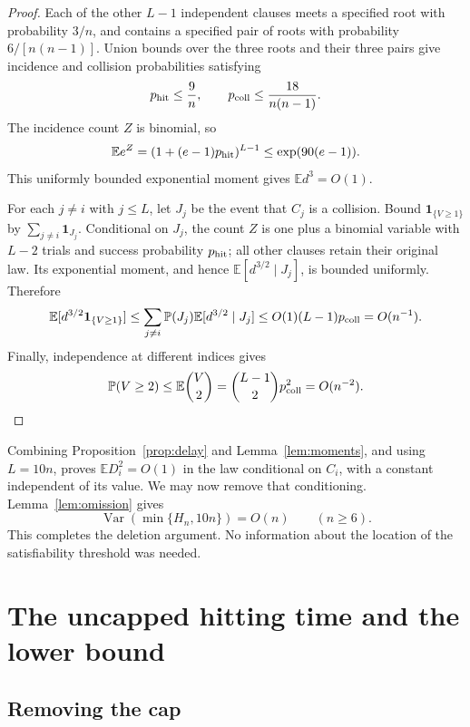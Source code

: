 \documentclass[11pt]{article}
\theoremstyle{remark}
\newcommand{\Prb}{\mathbb P}
\newcommand{\E}{\mathbb E}
\newcommand{\Var}{\operatorname{Var}}
\newcommand{\ind}{\mathbf 1}
\numberwithin{equation}{section}
\begin{document}
\begin{proof}
Each of the other $L-1$ independent clauses meets a specified root
with probability $3/n$, and contains a specified pair of roots with
probability $6/[n(n-1)]$. Union bounds over the three roots and their
three pairs give incidence and collision probabilities satisfying
\[
 p_{\rm hit}\le\frac9n,\qquad
 p_{\rm coll}\le\frac{18}{n(n-1)}.
\]
The incidence count $Z$ is binomial, so
\[
 \E e^Z=(1+(e-1)p_{\rm hit})^{L-1}
      \le\exp(90(e-1)).
\]
This uniformly bounded exponential moment gives $\E d^3=O(1)$.

For each $j\ne i$ with $j\le L$, let $J_j$ be the event that $C_j$
is a collision. Bound $\ind_{\{V\ge1\}}$ by
$\sum_{j\ne i}\ind_{J_j}$. Conditional on $J_j$, the count $Z$ is
one plus a binomial variable with $L-2$ trials and success probability
$p_{\rm hit}$; all other clauses retain their original law.
Its exponential moment, and hence $\E[d^{3/2}\mid J_j]$, is bounded
uniformly. Therefore
\[
 \E[d^{3/2}\ind_{\{V\ge1\}}]
 \le\sum_{j\ne i}\Prb(J_j)\E[d^{3/2}\mid J_j]
 \le O(1)(L-1)p_{\rm coll}=O(n^{-1}).
\]
Finally, independence at different indices gives
\[
 \Prb(V\ge2)\le\E\binom V2
 =\binom{L-1}{2}p_{\rm coll}^2=O(n^{-2}).
\]
\end{proof}

Combining Proposition~\ref{prop:delay} and Lemma~\ref{lem:moments},
and using $L=10n$, proves $\E D_i^2=O(1)$ in the law conditional
on $C_i$, with a constant independent of its value. We may now remove
that conditioning. Lemma~\ref{lem:omission} gives
\begin{equation}
 \Var(\min\{H_n,10n\})=O(n)\qquad(n\ge6).
 \label{eq:capped}
\end{equation}
This completes the deletion argument. No information about the
location of the satisfiability threshold was needed.

\section{The uncapped hitting time and the lower bound}
\label{sec:finish}

\subsection{Removing the cap}
\end{document}
